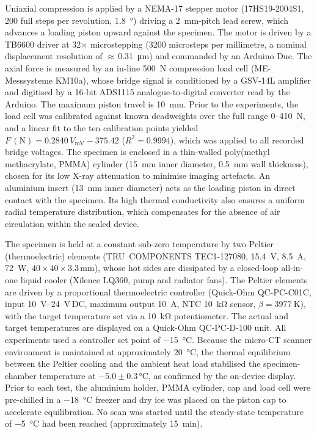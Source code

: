 \documentclass[preprint,12pt,numbers]{elsarticle}
\begin{document}
  Uniaxial compression is applied by a NEMA-17 stepper motor
  (17HS19-2004S1, \num{200} full steps per revolution, \SI{1.8}{\degree}) driving
  a \SI{2}{\milli\meter}-pitch lead screw, which advances a loading piston upward
  against the specimen. The motor is driven by a TB6600 driver at
  \num{32}$\times$ microstepping (\num{3200} microsteps per millimetre, a nominal
  displacement resolution of $\approx$\,\SI{0.31}{\micro\meter}) and commanded by an
  Arduino Due. The axial force is measured by an in-line \SI{500}{\newton}
  compression load cell (ME-Messsysteme KM10a), whose bridge signal is conditioned
  by a GSV-14L amplifier and digitised by a 16-bit ADS1115 analogue-to-digital
  converter read by the Arduino. The maximum piston travel is \SI{10}{\milli\meter}.
  Prior to the experiments, the load cell was calibrated against known deadweights
  over the full range 0--\SI{410}{\newton}, and a linear fit to the ten
  calibration points yielded $F\,(\si{\newton}) = 0.2840\,V_\mathrm{mV} - 375.42$
  ($R^2 = 0.9994$), which was applied to all recorded bridge voltages.
  The specimen is enclosed in a thin-walled poly(methyl methacrylate, PMMA)
  cylinder (\SI{15}{\milli\meter} inner diameter, \SI{0.5}{\milli\meter}
  wall thickness), chosen for its low X-ray attenuation to minimise imaging
  artefacts. An aluminium insert (\SI{13}{\milli\meter} inner diameter) acts
  as the loading piston in direct contact with the specimen.  Its high thermal
  conductivity also ensures a uniform radial temperature distribution, which
  compensates for the absence of air circulation within the sealed device.

  The specimen is held at a constant sub-zero temperature by two Peltier
  (thermoelectric) elements (TRU~COMPONENTS TEC1-127080, \SI{15.4}{\volt},
  \SI{8.5}{\ampere}, \SI{72}{\watt}, $40\times40\times3.3$\,\si{\milli\meter}),
  whose hot sides are dissipated by a closed-loop all-in-one liquid cooler
  (Xilence LQ360, pump and radiator fans). The Peltier elements are driven by a
  proportional thermoelectric controller (Quick-Ohm QC-PC-C01C,
  input \SIrange{10}{24}{\volt}\,DC, maximum output \SI{10}{\ampere},
  NTC \SI{10}{\kilo\ohm} sensor, $\beta = \SI{3977}{\kelvin}$), with the
  target temperature set via a \SI{10}{\kilo\ohm} potentiometer.  The actual
  and target temperatures are displayed on a Quick-Ohm QC-PC-D-100 unit.
  All experiments used a controller set point of \SI{-15}{\celsius}.  Because
  the micro-CT scanner environment is maintained at approximately
  \SI{20}{\celsius}, the thermal equilibrium between the Peltier cooling and
  the ambient heat load stabilised the specimen-chamber temperature at
  $-5.0 \pm 0.3$\,\si{\celsius}, as confirmed by the on-device display.
  Prior to each test, the aluminium holder, PMMA cylinder, cap and load cell
  were pre-chilled in a \SI{-18}{\celsius} freezer and dry ice was placed on
  the piston cap to accelerate equilibration.  No scan was started until the
  steady-state temperature of \SI{-5}{\celsius} had been reached
  (approximately \SI{15}{\minute}).
\end{document}
